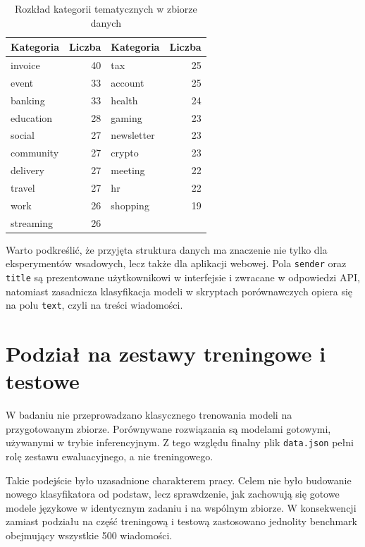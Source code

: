 \documentclass[12pt,a4paper,openany]{report}
\begin{document}
\begin{table}[H]
    \centering
    \small
    \begin{tabular}{l r l r}
        \toprule
        Kategoria & Liczba & Kategoria & Liczba \\
        \midrule
        invoice & 40 & tax & 25 \\
        event & 33 & account & 25 \\
        banking & 33 & health & 24 \\
        education & 28 & gaming & 23 \\
        social & 27 & newsletter & 23 \\
        community & 27 & crypto & 23 \\
        delivery & 27 & meeting & 22 \\
        travel & 27 & hr & 22 \\
        work & 26 & shopping & 19 \\
        streaming & 26 &  &  \\
        \bottomrule
    \end{tabular}
    \caption{Rozkład kategorii tematycznych w zbiorze danych}
    \label{tab:category-distribution}
\end{table}

Warto podkreślić, że przyjęta struktura danych ma znaczenie nie tylko dla eksperymentów wsadowych, lecz także dla aplikacji webowej. Pola \texttt{sender} oraz \texttt{title} są prezentowane użytkownikowi w interfejsie i zwracane w odpowiedzi API, natomiast zasadnicza klasyfikacja modeli w skryptach porównawczych opiera się na polu \texttt{text}, czyli na treści wiadomości.

\section{Podział na zestawy treningowe i testowe}

W badaniu nie przeprowadzano klasycznego trenowania modeli na przygotowanym zbiorze. Porównywane rozwiązania są modelami gotowymi, używanymi w trybie inferencyjnym. Z tego względu finalny plik \texttt{data.json} pełni rolę zestawu ewaluacyjnego, a nie treningowego.

Takie podejście było uzasadnione charakterem pracy. Celem nie było budowanie nowego klasyfikatora od podstaw, lecz sprawdzenie, jak zachowują się gotowe modele językowe w identycznym zadaniu i na wspólnym zbiorze. W konsekwencji zamiast podziału na część treningową i testową zastosowano jednolity benchmark obejmujący wszystkie 500 wiadomości.
\end{document}
